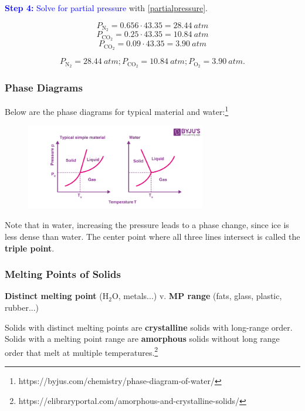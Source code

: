 \documentclass[a4paper, 12pt]{article}
\begin{document}
\textcolor{blue}{\textbf{Step 4:} Solve for partial pressure} with \ref{partialpressure}.

$$P_{\text{N}_2} = 0.656 \cdot 43.35 = 28.44 \: atm$$
$$P_{\text{CO}_2} = 0.25 \cdot 43.35 = 10.84 \: atm$$
$$P_{\text{CO}_2} = 0.09 \cdot 43.35 = 3.90 \: atm$$

$$\boxed{P_{\text{N}_2} = 28.44 \: atm; P_{\text{CO}_2} = 10.84 \: atm; P_{\text{O}_2} = 3.90 \: atm.}$$

\subsubsection{Phase Diagrams}
Below are the phase diagrams for typical material and water:\footnote{https://byjus.com/chemistry/phase-diagram-of-water/}

\begin{figure}[H]
\centering
\includegraphics[width=0.7\textwidth]{phasediag.png}
\end{figure}

Note that in water, increasing the pressure leads to a phase change, since ice is less dense than water. The center point where all three lines intersect is called the \textbf{triple point}.

\subsubsection{Melting Points of Solids}
\textbf{Distinct melting point} (H$_2$O, metals...) v. \textbf{MP range} (fats, glass, plastic, rubber...)

Solids with distinct melting points are \textbf{crystalline} solids with long-range order. Solids with a melting point range are \textbf{amorphous} solids without long range order that melt at multiple temperatures.\footnote{https://elibraryportal.com/amorphous-and-crystalline-solids/}
\end{document}
